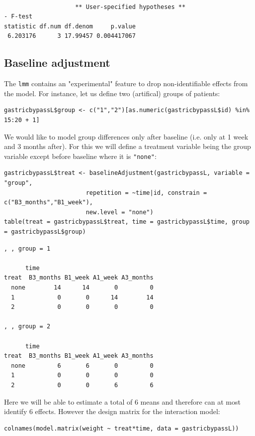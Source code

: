 \documentclass[12pt]{article}
\begin{document}
\begin{verbatim}

                    ** User-specified hypotheses ** 
- F-test
statistic df.num df.denom     p.value
 6.203176      3 17.99457 0.004417067
\end{verbatim}



\clearpage

\subsection{Baseline adjustment}
\label{sec:orge8d1041}

The \texttt{lmm} contains an "experimental" feature to drop non-identifiable
effects from the model. For instance, let us define two (artifical) groups of
patients:
\lstset{language=r,label= ,caption= ,captionpos=b,numbers=none}
\begin{lstlisting}
gastricbypassL$group <- c("1","2")[as.numeric(gastricbypassL$id) %in% 15:20 + 1]
\end{lstlisting}
We would like to model group differences only after baseline
(i.e. only at 1 week and 3 months after). For this we will define a
treatment variable being the group variable except before baseline where
it is \texttt{"none"}:
\lstset{language=r,label= ,caption= ,captionpos=b,numbers=none}
\begin{lstlisting}
gastricbypassL$treat <- baselineAdjustment(gastricbypassL, variable = "group",
					   repetition = ~time|id, constrain = c("B3_months","B1_week"),
					   new.level = "none")
table(treat = gastricbypassL$treat, time = gastricbypassL$time, group = gastricbypassL$group)
\end{lstlisting}

\begin{verbatim}
, , group = 1

      time
treat  B3_months B1_week A1_week A3_months
  none        14      14       0         0
  1            0       0      14        14
  2            0       0       0         0

, , group = 2

      time
treat  B3_months B1_week A1_week A3_months
  none         6       6       0         0
  1            0       0       0         0
  2            0       0       6         6
\end{verbatim}

Here we will be able to estimate a total of 6 means and therefore can
at most identify 6 effects. However the design matrix for the
interaction model:
\lstset{language=r,label= ,caption= ,captionpos=b,numbers=none}
\begin{lstlisting}
colnames(model.matrix(weight ~ treat*time, data = gastricbypassL))
\end{lstlisting}
\end{document}
